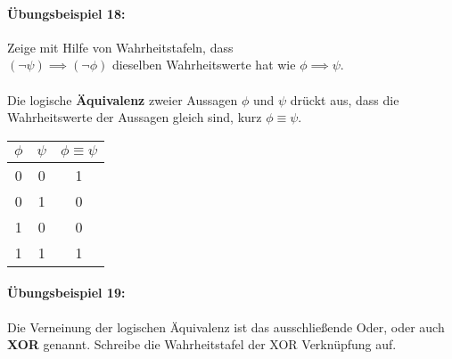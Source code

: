 \documentclass[11pt,a4paper,leqno]{report}
\numberwithin{equation}{chapter}
\begin{document}
\paragraph{Übungsbeispiel 18:} Zeige mit Hilfe von Wahrheitstafeln, dass \\$(\neg\psi)\implies(\neg\phi)$ dieselben Wahrheitswerte hat wie $\phi\implies\psi$.\\
\\
Die logische \textbf{Äquivalenz} zweier Aussagen  $\phi$ und $\psi$ drückt aus, dass die Wahrheitswerte der Aussagen gleich sind, kurz $\phi\equiv\psi$.
\begin{center}
	\begin{tabular}{|c c|c|}
		$\phi$ & $\psi$ & $\phi \equiv \psi$\\
		\hline
		0 & 0 & 1\\
		0 & 1 & 0\\
		1 & 0 & 0\\
		1 & 1 & 1\\
	\end{tabular}  
\end{center}
\paragraph{Übungsbeispiel 19:} Die Verneinung der logischen Äquivalenz ist das ausschließende Oder, oder auch \textbf{XOR} genannt. Schreibe die Wahrheitstafel der XOR Verknüpfung auf.
\newpage
\end{document}

